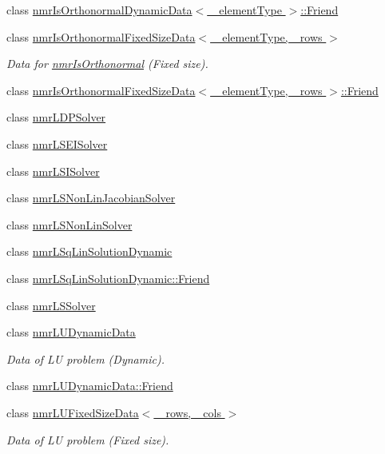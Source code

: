 \begin{DoxyCompactItemize}
class \hyperlink{classnmr_is_orthonormal_dynamic_data_1_1_friend}{nmr\+Is\+Orthonormal\+Dynamic\+Data$<$ \+\_\+element\+Type $>$\+::\+Friend}
\item 
class \hyperlink{classnmr_is_orthonormal_fixed_size_data}{nmr\+Is\+Orthonormal\+Fixed\+Size\+Data$<$ \+\_\+element\+Type, \+\_\+rows $>$}
\begin{DoxyCompactList}\small\item\em Data for \hyperlink{nmr_is_orthonormal_8h_acf0ff1e2dbe0c988db04d9db1e2e7697}{nmr\+Is\+Orthonormal} (Fixed size). \end{DoxyCompactList}\item 
class \hyperlink{classnmr_is_orthonormal_fixed_size_data_1_1_friend}{nmr\+Is\+Orthonormal\+Fixed\+Size\+Data$<$ \+\_\+element\+Type, \+\_\+rows $>$\+::\+Friend}
\item 
class \hyperlink{classnmr_l_d_p_solver}{nmr\+L\+D\+P\+Solver}
\item 
class \hyperlink{classnmr_l_s_e_i_solver}{nmr\+L\+S\+E\+I\+Solver}
\item 
class \hyperlink{classnmr_l_s_i_solver}{nmr\+L\+S\+I\+Solver}
\item 
class \hyperlink{classnmr_l_s_non_lin_jacobian_solver}{nmr\+L\+S\+Non\+Lin\+Jacobian\+Solver}
\item 
class \hyperlink{classnmr_l_s_non_lin_solver}{nmr\+L\+S\+Non\+Lin\+Solver}
\item 
class \hyperlink{classnmr_l_sq_lin_solution_dynamic}{nmr\+L\+Sq\+Lin\+Solution\+Dynamic}
\item 
class \hyperlink{classnmr_l_sq_lin_solution_dynamic_1_1_friend}{nmr\+L\+Sq\+Lin\+Solution\+Dynamic\+::\+Friend}
\item 
class \hyperlink{classnmr_l_s_solver}{nmr\+L\+S\+Solver}
\item 
class \hyperlink{classnmr_l_u_dynamic_data}{nmr\+L\+U\+Dynamic\+Data}
\begin{DoxyCompactList}\small\item\em Data of L\+U problem (Dynamic). \end{DoxyCompactList}\item 
class \hyperlink{classnmr_l_u_dynamic_data_1_1_friend}{nmr\+L\+U\+Dynamic\+Data\+::\+Friend}
\item 
class \hyperlink{classnmr_l_u_fixed_size_data}{nmr\+L\+U\+Fixed\+Size\+Data$<$ \+\_\+rows, \+\_\+cols $>$}
\begin{DoxyCompactList}\small\item\em Data of L\+U problem (Fixed size). \end{DoxyCompactList}\item 

\end{DoxyCompactItemize}
